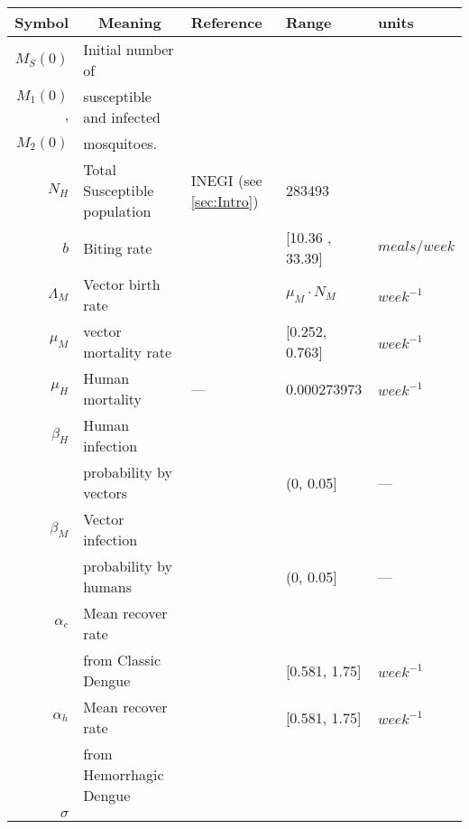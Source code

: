 
\begin{table*}[htb]
		\begin{tabular}{rl m{1.9cm} ll}
			\toprule
			Symbol		&	\multicolumn{1}{c}{Meaning} &
				Reference	& Range & units
		\\
		\midrule
			$M_S(0)$
				& Initial number of 
		\\
			$M_1(0)$,
				& susceptible and infected
		\\
		    $M_2(0)$
		    &  mosquitoes.
		\\
		$N_H$
		    & Total Susceptible population
		    &  INEGI (see \cref{sec:Intro})
		    & \num{283493}
		\\
			$b$
			& Biting rate
			&\cite{YasunoM1990}
			&[10.36 , 33.39] & $\si{meals \per week}$ 
		\\
			$\Lambda_M$
			& Vector birth rate
			&
			& $\mu_M \cdot N_M$
			& $\si{week^{-1}}$
		\\
			$\mu_M$
			& vector mortality rate
			& \cite{YANG2009}
            & [\num{0.252}, \num{0.763}] 
            & $\si{week^{-1}}$
    \\
			$\mu_H$
			& Human mortality
			&---
			& \num{0.000273973} 
			& $\si{week^{-1}}$
		\\
			$\beta_H$ 
			&	Human infection 
			\\
      & probability  by vectors
			& \cite{Feng1997a} 
			& (\num{0}, \num{0.05}] 
			& ---
		\\
			$\beta_M$
			& Vector infection 
			\\
      & probability by humans
			& \cite{Feng1997a}& (\num{0}, \num{0.05}] & ---
		\\
			$\alpha_{c}$ 
			& Mean recover rate 
			\\
      & from Classic Dengue
			&\cite{Pinho2010}
			& [\num{0.581}, \num{1.75}] & $\si{week^{-1}}$
		\\
			$\alpha_{h}$	& Mean recover rate
			& \cite{Pinho2010} 
			& [\num{0.581}, \num{1.75}] 
			& $\si{week^{-1}}$
		\\
			& from Hemorrhagic Dengue
		\\
			$\sigma$

\end{tabular}
\end{table*}
